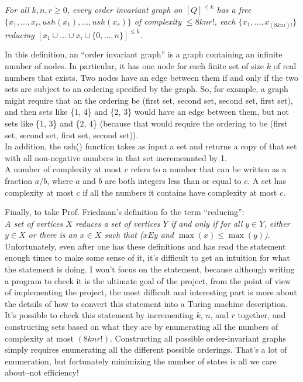 \documentclass{article}
\begin{document}
\emph{For all $k, n, r \ge 0$, every order invariant graph on $[Q]^{\le k}$ has a free $\{x_1,\dots,x_r,ush(x_1),...,ush(x_r)\}$ of complexity $\le 8knr!$, each
$\{x_1, \dots, x_{(8kni)!}\}$ reducing $[x_1 \cup \dots \cup x_i \cup \{0,\dots,n\}]^{\le k}$.}

In this definition, an ``order invariant graph'' is a graph containing an infinite number of nodes. In particular, it has one node for each finite set of size $k$ of real numbers that exists. Two nodes have an edge between them if and only if the two sets are subject to an ordering specified by the graph. So, for example, a graph might require that an the ordering be (first set, second set, second set, first set), and then sets like \{1, 4\} and \{2, 3\} would have an edge between them, but not sets like \{1, 3\} and \{2, 4\} (because that would require the ordering to be (first set, second set, first set, second set)).  \\

In addition, the ush() function takes as input a set and returns a copy of that set with all non-negative numbers in that set incrememnted by 1. \\ 

A number of complexity at most $c$ refers to a number that can be written as a fraction $a/b$, where $a$ and $b$ are both integers less than or equal to $c$. A set has complexity at most $c$ if all the numbers it contains have complexity at most $c$.

Finally, to take Prof. Friedman's definition fo the term ``reducing'': \\

\emph{A set of vertices $X$ reduces a set of vertices $Y$ if and only if for all $y \in Y$, either $y \in X$ or there is an $x \in X$ such that ($x E y$ and $\max(x) \le \max(y)$)}. \\

Unfortunately, even after one has these definitions and has read the statement enough times to make some sense of it, it's difficult to get an intuition for what the statement is doing. I won't focus on the statement, because although writing a program to check it is the ultimate goal of the project, from the point of view of implementing the project, the most difficult and interesting part is more about the details of how to convert this statement into a Turing machine description. \\

It's possible to check this statement by incrementing $k$, $n$, and $r$ together, and constructing sets based on what they are by enumerating all the numbers of complexity at most $(8knr!)$. Constructing all possible order-invariant graphs simply requires enumerating all the different possible orderings. That's a lot of enumeration, but fortunately minimizing the number of states is all we care about--not efficiency! \\
\end{document}
